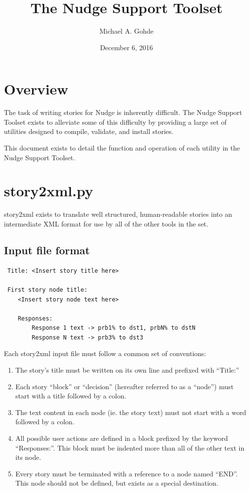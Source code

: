 \documentclass[12pt,letterpaper]{article}
\begin{document}
 
 \title{The Nudge Support Toolset}
 \author{Michael A. Gohde}
 \date{December 6, 2016}
 \maketitle
 
 \section{Overview}
 The task of writing stories for Nudge is inherently difficult. The Nudge
 Support Toolset exists to alleviate some of this difficulty by providing
 a large set of utilities designed to compile, validate, and install stories.
 
 This document exists to detail the function and operation of each utility
 in the Nudge Support Toolset.
 
 \section{story2xml.py}
 story2xml exists to translate well structured, human-readable stories into 
 an intermediate XML format for use by all of the other tools in the set.
 
 \subsection{Input file format}
 \lstset{numbers=left, frame=shadowbox}
 \begin{lstlisting}
 Title: <Insert story title here>
 
 First story node title:
    <Insert story node text here>
    
    Responses:
        Response 1 text -> prb1% to dst1, prbN% to dstN
        Response N text -> prb3% to dst3
 \end{lstlisting}
 
 Each story2xml input file must follow a common set of conventions:
 \begin{enumerate}
   \item The story's title must be written on its own line and prefixed with ``Title:''
   \item Each story ``block'' or ``decision'' (hereafter referred to as a ``node'') must start with a title followed by a colon.
   \item The text content in each node (ie. the story text) must not start with a word followed by a colon.
   \item All possible user actions are defined in a block prefixed by the keyword ``Responses:''. This block must be indented more than all of the other text in its node.
   \item Every story must be terminated with a reference to a node named ``END''. This node should not be defined, but exists as a special destination.
 \end{enumerate}
 
\end{document}

